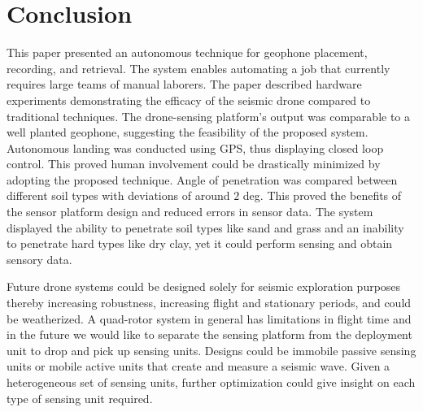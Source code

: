  \section{Conclusion}\label{sec:Conclusion}
This paper presented an autonomous technique for geophone placement, recording, and retrieval. The system enables automating a job that currently requires large teams of manual laborers.
 The paper described hardware experiments demonstrating the efficacy of the seismic drone compared to traditional techniques. The drone-sensing platform's output was comparable to a well planted geophone, suggesting the feasibility of the proposed system. Autonomous landing was conducted using GPS, thus displaying closed loop control. This proved human involvement could be drastically minimized by adopting the proposed technique. Angle of penetration was compared between different soil types with deviations of around $2$ deg. This proved the benefits of the sensor platform design and reduced errors in sensor data. The system displayed the ability to penetrate soil types like sand and grass and an inability to penetrate hard types like dry clay, yet it could perform sensing and obtain sensory data.
 
Future drone systems could be designed solely for seismic exploration purposes thereby increasing robustness, increasing flight and stationary periods, and could be weatherized.  
A quad-rotor system in general has limitations in flight time and in the future we would like to separate the sensing platform from the deployment unit to drop and pick up sensing units. Designs could be immobile passive sensing units or mobile active units that create and measure a seismic wave. Given a heterogeneous set of sensing units, further optimization could give insight on each type of sensing unit required. 


